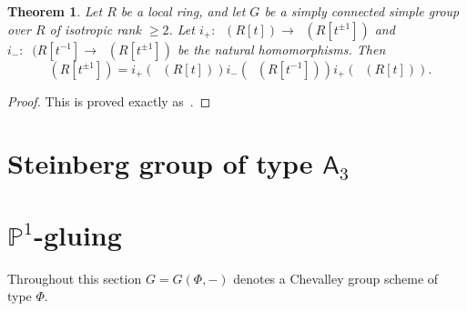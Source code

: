 \documentclass[oneside,12pt]{amsart}
\newtheorem{thm}{Theorem}
\numberwithin{equation}{section}
\numberwithin{lem}{section}
\theoremstyle{definition}
\theoremstyle{remark}
\DeclareMathOperator{\St}{St^G}
\newcommand{\Pro}{\mathbb{P}}
\newcommand{\rA}{\mathsf{A}}
\begin{document}
\begin{thm}\label{thm:3t}
Let $R$ be a local ring, and let $G$ be a simply connected simple group over $R$
of isotropic rank $\ge 2$. Let $i_+:\St(R[t])\to\St(R[t^{\pm 1}])$ and $i_-:\St(R[t^{-1}]\to
\St(R[t^{\pm 1}])$ be the natural homomorphisms.
Then
$$
\St(R[t^{\pm 1}])=i_+(\St(R[t]))i_-(\St(R[t^{-1}]))i_+(\St(R[t])).
$$
\end{thm}
\begin{proof}
This is proved exactly as~\cite[Theorem 5.1]{St-poly}.
\end{proof}



\section{Steinberg group of type \texorpdfstring{$\rA_3$}{A\textthreeinferior}} 


\section{\texorpdfstring{$\Pro^1$}{P\textonesuperior}-gluing}
Throughout this section $G=G(\Phi, -)$ denotes a Chevalley group scheme of type $\Phi$.
\end{document}
